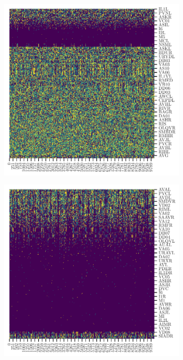 \begin{figure}
	\centering
	\begin{subfigure}[b]{0.3\textwidth}
		\centering
		\includegraphics[width=\textwidth]{cluster_super_critico}
		\caption{}
		\label{fig:cluster_supercritico}
	\end{subfigure}
	\begin{subfigure}[b]{0.3\textwidth}
		\centering
		\includegraphics[width=\textwidth]{cluster_critico}

\end{subfigure}
\end{figure}
